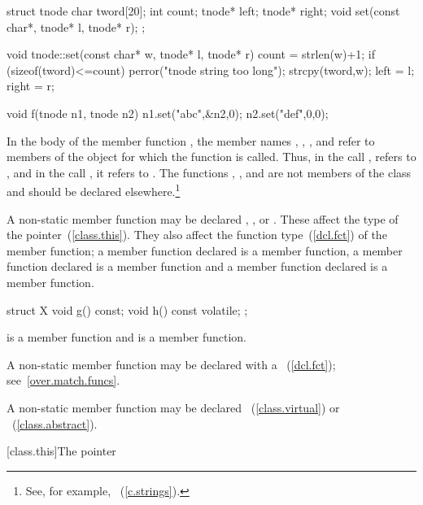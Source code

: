 \begin{codeblock}
struct tnode {
  char tword[20];
  int count;
  tnode* left;
  tnode* right;
  void set(const char*, tnode* l, tnode* r);
};

void tnode::set(const char* w, tnode* l, tnode* r) {
  count = strlen(w)+1;
  if (sizeof(tword)<=count)
      perror("tnode string too long");
  strcpy(tword,w);
  left = l;
  right = r;
}

void f(tnode n1, tnode n2) {
  n1.set("abc",&n2,0);
  n2.set("def",0,0);
}
\end{codeblock}

In the body of the member function , the member names
, , , and  refer to
members of the object for which the function is called. Thus, in the
call ,  refers to
, and in the call , it refers
to . The functions , , and
 are not members of the class  and should be
declared elsewhere.\footnote{See, for example, ~(\ref{c.strings}).}
\exitexample

\pnum
A non-static member function may be declared ,
, or  . These
 affect the type of the 
pointer~(\ref{class.this}). They also affect the function
type~(\ref{dcl.fct}) of the member function; a member function declared
 is a  member function, a member function
declared  is a  member function and a
member function declared   is a
 member function.
\enterexample

\begin{codeblock}
struct X {
  void g() const;
  void h() const volatile;
};
\end{codeblock}

 is a  member function and  is a
  member function.
\exitexample

\pnum
A non-static member function may be declared with a ~(\ref{dcl.fct}); see~\ref{over.match.funcs}.

\pnum
A non-static member function may be declared
~(\ref{class.virtual}) or ~(\ref{class.abstract}).

[class.this]{The  pointer}%

